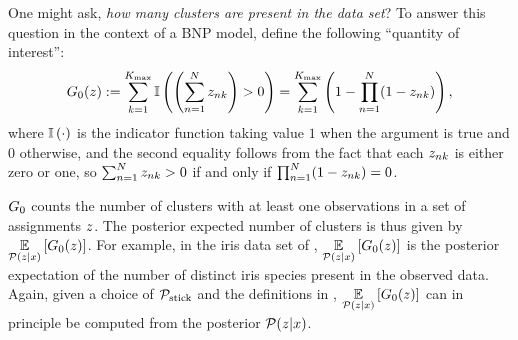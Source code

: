 

\begin{ex}

One might ask, \textit{how many clusters are present in the data set}? To answer
this question in the context of a BNP model, define the
following ``quantity of interest'':
%
\begin{align*}
  G_0(z) := \sum_{k=1}^{K_{\mathrm{max}}} \mathbb{I}\left( \left(\sum_{n=1}^{N}
  z_{nk}\right) > 0\right)
  = \sum_{k=1}^{{K_{\mathrm{max}}}} \left(1 -  \prod_{n=1}^N (1 - z_{nk})\right),
\end{align*}
%
where $\mathbb{I}\left(\cdot\right)$ is the indicator function taking value $1$ when the argument
is true and $0$ otherwise, and the second equality follows from the fact that
each $z_{nk}$ is either zero or one, so $\sum_{n=1}^N z_{nk} > 0$ if and
only if $\prod_{n=1}^N (1 - z_{nk}) = 0$.

$G_0$ counts the number of clusters with at
least one observations in a set of assignments $z$.  The posterior expected
number of clusters is thus given by $\underset{\mathcal{P}(z\vert x)}{\mathbb{E}}\left[G_0(z)\right]$.
For example, in the iris data set of ,
$\underset{\mathcal{P}(z\vert x)}{\mathbb{E}}\left[G_0(z)\right]$ is the posterior expectation of the
number of distinct iris species present in the observed data.
%
Again, given a choice of $\mathcal{P}_{\mathrm{stick}}$ and the definitions in
, $\underset{\mathcal{P}(z\vert x)}{\mathbb{E}}\left[G_0(z)\right]$ can in
principle be computed from the posterior $\mathcal{P}(z \vert x)$.
%
\end{ex}

